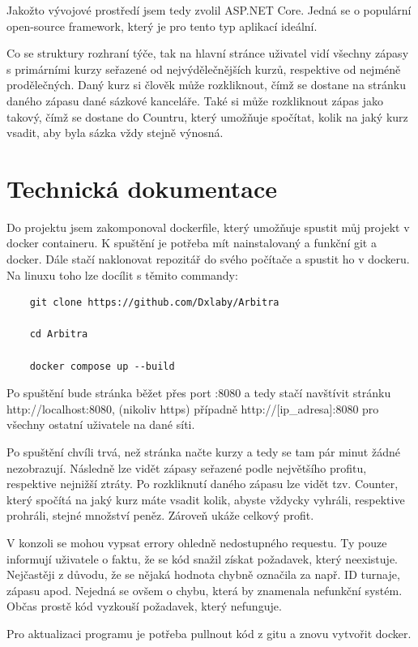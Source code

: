 \documentclass[11pt,a4paper,twoside,openright]{report}
\begin{document}
Jakožto vývojové prostředí jsem tedy zvolil ASP.NET Core. Jedná se o populární open-source framework, který je pro tento typ aplikací ideální. 

Co se struktury rozhraní týče, tak na hlavní stránce uživatel vidí všechny zápasy s primárními kurzy seřazené od nejvýdělečnějších kurzů, respektive od nejméně prodělečných. Daný kurz si člověk může rozkliknout, čímž se dostane na stránku daného zápasu dané sázkové kanceláře. Také si může rozkliknout zápas jako takový, čímž se dostane do Countru, který umožňuje spočítat, kolik na jaký kurz vsadit, aby byla sázka vždy stejně výnosná. 

\chapter{Technická dokumentace}
Do projektu jsem zakomponoval dockerfile, který umožňuje spustit můj projekt v docker containeru. K spuštění je potřeba mít nainstalovaný a funkční git a docker. Dále stačí naklonovat repozitář do svého počítače a spustit ho v dockeru. Na linuxu toho lze docílit s těmito commandy: 
\begin{verbatim}
	git clone https://github.com/Dxlaby/Arbitra

	cd Arbitra

	docker compose up --build
\end{verbatim}


Po spuštění bude stránka běžet přes port :8080 a tedy stačí navštívit stránku http://localhost:8080, (nikoliv https) případně http://[ip\_adresa]:8080 pro všechny ostatní uživatele na dané síti. 

Po spuštění chvíli trvá, než stránka načte kurzy a tedy se tam pár minut žádné nezobrazují. Následně lze vidět zápasy seřazené podle největšího profitu, respektive nejnižší ztráty. Po rozkliknutí daného zápasu lze vidět tzv. Counter, který spočítá na jaký kurz máte vsadit kolik, abyste vždycky vyhráli, respektive prohráli, stejné množství peněz. Zároveň ukáže celkový profit.

V konzoli se mohou vypsat errory ohledně nedostupného requestu. Ty pouze informují uživatele o faktu, že se kód snažil získat požadavek, který neexistuje. Nejčastěji z důvodu, že se nějaká hodnota chybně označila za např. ID turnaje, zápasu apod. Nejedná se ovšem o chybu, která by znamenala nefunkční systém. Občas prostě kód vyzkouší požadavek, který nefunguje. 

Pro aktualizaci programu je potřeba pullnout kód z gitu a znovu vytvořit docker.
\end{document}
